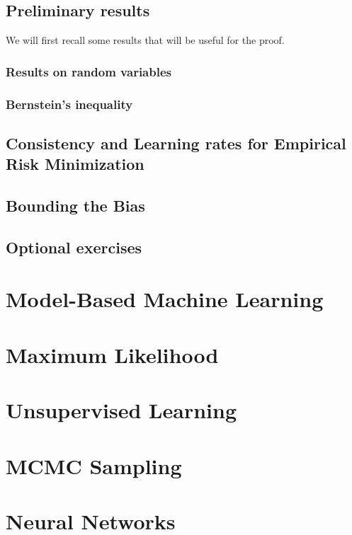 \documentclass{../cs-classes/cs-classes}
\begin{document}
\subsection{Preliminary results}
We will first recall some results that will be useful for the proof.
\subsubsection{Results on random variables}

\subsubsection{Bernstein's inequality}

\subsection{Consistency and Learning rates for Empirical Risk Minimization}

\subsection{Bounding the Bias}

\subsection{Optional exercises}


\section{Model-Based Machine Learning}

\section{Maximum Likelihood}

\section{Unsupervised Learning}

\section{MCMC Sampling}

\section{Neural Networks}
\end{document}
